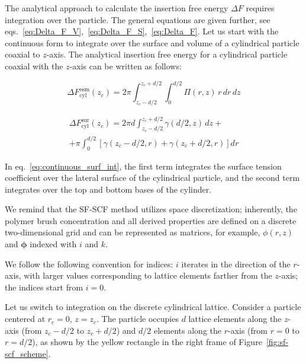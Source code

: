 \documentclass[10pt, a4paper]{article}
\begin{document}
\begin{multicols}{2}

The analytical approach to calculate the insertion free energy $\Delta F$ requires integration over the particle.
The general equations are given further, see eqs.~\ref{eq:Delta_F_V},~\ref{eq:Delta_F_S},~\ref{eq:Delta_F}.
Let us start with the continuous form to integrate over the surface and volume of a cylindrical particle coaxial to $z$-axis.
The analytical insertion free energy for a cylindrical particle coaxial with the $z$-axis can be written as follows:

\begin{equation}
    \Delta F_{\text{cyl}}^{\text{osm}}(z_c) = 2 \pi \int_{z_c - d/2}^{z_c + d/2} \int_{0}^{d/2} \Pi(r, z) \, r \, dr \, dz
\end{equation}

\begin{equation}\label{eq:continuous_surf_int}
    \begin{aligned}
        \Delta F_{\text{cyl}}^{\text{sur}}(z_c) = 2 \pi d \int_{z_c - d/2}^{z_c + d/2} \gamma(d/2, z) \, dz +\\
        + \pi \int_{0}^{d/2} \left[ \gamma(z_c - d/2, r) + \gamma(z_c + d/2, r) \right] dr
    \end{aligned}
\end{equation}

In eq.~\ref{eq:continuous_surf_int}, the first term integrates the surface tension coefficient over the lateral surface of the cylindrical particle, and the second term integrates over the top and bottom bases of the cylinder.

We remind that the SF-SCF method utilizes space discretization; inherently, the polymer brush concentration and all derived properties are defined on a discrete two-dimensional grid and can be represented as matrices, for example, $\phi(r, z)$ and $\boldsymbol{\phi}$ indexed with $i$ and $k$.

We follow the following convention for indices: $i$ iterates in the direction of the $r$-axis, with larger values corresponding to lattice elements farther from the $z$-axis; the indices start from $i=0$.

Let us switch to integration on the discrete cylindrical lattice.
Consider a particle centered at $r_c = 0$, $z = z_c$.
The particle occupies $d$ lattice elements along the $z$-axis (from $z_c - d/2$ to $z_c + d/2$) and $d/2$ elements along the $r$-axis (from $r = 0$ to $r = d/2$), as shown by the yellow rectangle in the right frame of Figure~\ref{fig:sf-scf_scheme}.


\end{multicols}
\end{document}
